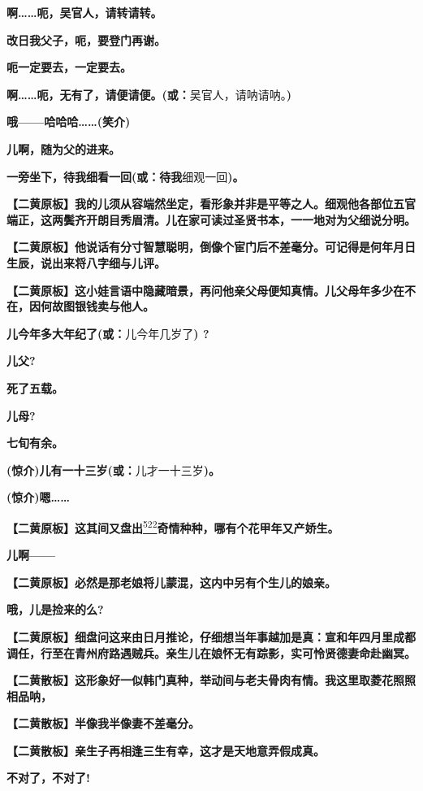 \textbf{啊\ldots{}\ldots{}呃，吴官人，请转请转。}

\textbf{改日我父子，呃，要登门再谢。}

\textbf{呃一定要去，一定要去。}

\textbf{啊\ldots{}\ldots{}呃，无有了，请便请便。(或：}吴官人，请呐请呐。\textbf{)}

\textbf{哦------哈哈哈\ldots{}\ldots{}(笑介)}

\textbf{儿啊，随为父的进来。}

\textbf{一旁坐下，待我细看一回(或：待我}细观一回\textbf{)。}

\textbf{【二黄原板】我的儿须从容端然坐定，看形象并非是平等之人。细观他各部位五官端正，这两鬓齐开朗目秀眉清。儿在家可读过圣贤书本，一一地对为父细说分明。}

\textbf{【二黄原板】他说话有分寸智慧聪明，倒像个宦门后不差毫分。可记得是何年月日生辰，说出来将八字细与儿评。}

\textbf{【二黄原板】这小娃言语中隐藏暗景，再问他亲父母便知真情。儿父母年多少在不在，因何故图银钱卖与他人。}

\textbf{儿今年多大年纪了(或：}儿今年几岁了\textbf{) ?}

\textbf{儿父?}

\textbf{死了五载。}

\textbf{儿母?}

\textbf{七旬有余。}

\textbf{(惊介)儿有一十三岁(或：}儿才一十三岁\textbf{)。}

\textbf{(惊介)嗯\ldots{}\ldots{}}

\textbf{【二黄原板】这其间又盘出}\protect\hyperlink{fn522}{\textsuperscript{522}}\textbf{奇情种种，哪有个花甲年又产娇生。}

\textbf{儿啊------}

\textbf{【二黄原板】必然是那老娘将儿蒙混，这内中另有个生儿的娘亲。}

\textbf{哦，儿是捡来的么?}

\textbf{【二黄原板】细盘问这来由日月推论，仔细想当年事越加是真：宣和年四月里成都调任，行至在青州府路遇贼兵。亲生儿在娘怀无有踪影，实可怜贤德妻命赴幽冥。}

\textbf{【二黄散板】这形象好一似韩门真种，举动间与老夫骨肉有情。我这里取菱花照照相品呐，}

\textbf{【二黄散板】半像我半像妻不差毫分。}

\textbf{【二黄散板】亲生子再相逢三生有幸，这才是天地意弄假成真。}

\textbf{不对了，不对了!}

